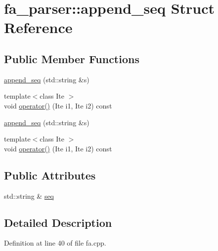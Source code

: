 \hypertarget{structfa__parser_1_1append__seq}{\section{fa\+\_\+parser\+:\+:append\+\_\+seq Struct Reference}
\label{structfa__parser_1_1append__seq}
}
\subsection*{Public Member Functions}
\begin{DoxyCompactItemize}
\item 
\hyperlink{structfa__parser_1_1append__seq_ac4014e74c64af13d65fcffc3258704bd}{append\+\_\+seq} (std\+::string \&s)
\item 
{\footnotesize template$<$class Ite $>$ }\\void \hyperlink{structfa__parser_1_1append__seq_acc924c9cafca4e4380a066d897c19fa6}{operator()} (Ite i1, Ite i2) const 
\item 
\hyperlink{structfa__parser_1_1append__seq_ac4014e74c64af13d65fcffc3258704bd}{append\+\_\+seq} (std\+::string \&s)
\item 
{\footnotesize template$<$class Ite $>$ }\\void \hyperlink{structfa__parser_1_1append__seq_acc924c9cafca4e4380a066d897c19fa6}{operator()} (Ite i1, Ite i2) const 
\end{DoxyCompactItemize}
\subsection*{Public Attributes}
\begin{DoxyCompactItemize}
\item 
std\+::string \& \hyperlink{structfa__parser_1_1append__seq_a0354ac97946d852a422bdcc0a5e52a2d}{seq}
\end{DoxyCompactItemize}


\subsection{Detailed Description}


Definition at line 40 of file fa.\+cpp.



